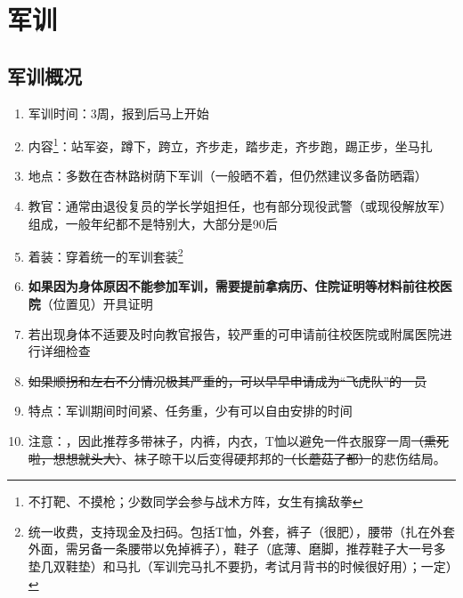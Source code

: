 \chapter[军训]{军训\vspace{-2em}}
\section[军训概况]{军训概况\vspace{-0.5em}}
\begin{enumerate}
    \item 军训时间：3周，报到后马上开始
    \item 内容\footnote{不打靶、不摸枪；少数同学会参与战术方阵，女生有擒敌拳}：站军姿，蹲下，跨立，齐步走，踏步走，齐步跑，踢正步，坐马扎
    \item 地点：多数在杏林路树荫下军训（一般晒不着，但仍然建议多备防晒霜）
    \item 教官：通常由退役复员的学长学姐担任，也有部分现役武警（或现役解放军）组成，一般年纪都不是特别大，大部分是90后
    \item 着装：穿着统一的军训套装\footnote{统一收费，支持现金及扫码。包括T恤，外套，裤子（很肥），腰带（扎在外套外面，需另备一条腰带以免掉裤子），鞋子（底薄、磨脚，推荐鞋子大一号多垫几双鞋垫）和马扎（军训完马扎不要扔，考试月背书的时候很好用）；一定）}
    \item \textbf{如果因为身体原因不能参加军训，需要提前拿病历、住院证明等材料前往校医院}（位置见\dashuline{\ref{map_a}}）开具证明\label{exercise_unattend}
    \item 若出现身体不适要及时向教官报告，较严重的可申请前往校医院或附属医院进行详细检查
    \item \sout{如果顺拐和左右不分情况极其严重的，可以早早申请成为“飞虎队”\footnotemark 的一员}
    \item 特点：军训期间时间紧、任务重，少有可以自由安排的时间
    \item 注意：，因此推荐多带袜子，内裤，内衣，T恤以避免一件衣服穿一周\sout{（熏死\\啦，想想就头大）}、袜子晾干以后变得硬邦邦的\sout{（长蘑菇了都）}的悲伤结局。
\end{enumerate}
\vspace{-1.5em}
